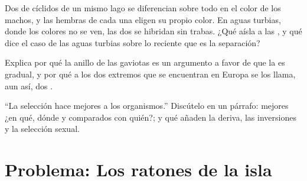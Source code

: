 \begin{exercise}[$\star\star\star$]\label{exo:g12:selection-drift-speciation:13}
Dos  de cíclidos de un mismo lago se diferencian sobre todo en
el color de los machos, y las hembras de cada una eligen su propio
color. En aguas turbias, donde los colores no se ven, las dos se
hibridan sin trabas. ¿Qué aísla a las , y qué dice el caso de
las aguas turbias sobre lo reciente que es la separación?
\end{exercise}

\begin{exercise}[$\star\star\star$]\label{exo:g12:selection-drift-speciation:14}
Explica por qué la  anillo de las gaviotas es un argumento a
favor de que la  es gradual, y por qué a los dos extremos
que se encuentran en Europa se los llama, aun así, dos .
\end{exercise}

\begin{exercise}[$\star\star\star$]\label{exo:g12:selection-drift-speciation:15}
``La selección hace mejores a los organismos.'' Discútelo en un
párrafo: mejores ¿en qué, dónde y comparados con quién?; y qué añaden
la deriva, las inversiones y la selección sexual.
\end{exercise}

\section{Problema: Los ratones de la isla}


